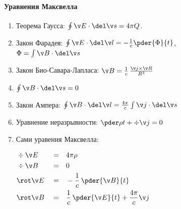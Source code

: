 \documentclass{trchesh}
\begin{document}
\begin{multicols*}{3}\raggedright%
\parindent=0pt
\paragraph{Уравнения Максвелла}
\begin{enumerate}
  \item Теорема Гаусса: $\oint \v E \cdot \del \v s = 4 \pi Q$.
  \item Закон Фарадея: $\oint\v E \cdot \del \v l = - \frac{1}{c} \pder{\Phi}{t}$, \\
    $\Phi=\int \v B \cdot \del \v s$
  \item Закон Био-Савара-Лапласа: $\v B = \frac{1}{c} \, \frac{\v j \times \v R}{R^3}$
  \item $\oint \v B \cdot \del \v s = 0$
  \item Закон Ампера: $\oint \v B \cdot \del \v l = \frac{4 \pi}{c} \int \v j \cdot \del \v s$
  \item Уравнение неразрывности: $\pder \rho t  + \div \v j = 0 $
  \item Сами уравения Максвелла: \par\vspace{1ex}$
    \begin{aligned}
      &\div \v E &&=&& 4 \pi \rho \\
      &\div \v B &&=&& 0 \\
      &\rot \v E &&=&& - \frac 1 c \, \pder{\v B}{t} \\
      &\rot \v B &&=&& \frac 1 c\, \pder{\v E}{t} + \frac{4 \pi}{c}\v j
    \end{aligned}$
\end{enumerate}


\end{multicols*}
\end{document}
